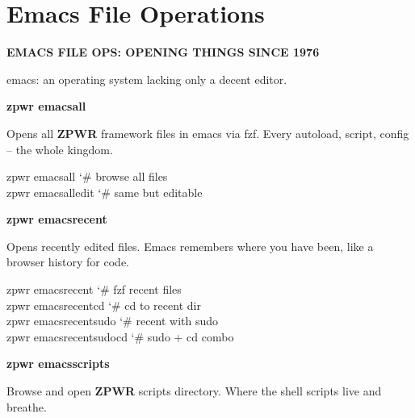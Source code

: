 \documentclass[11pt,a4paper,twoside]{book}
\begin{document}
\vspace{16pt}

\section{Emacs File Operations}


\vspace{10pt}
{\large\bfseries\color{neoncyan} EMACS FILE OPS: OPENING THINGS SINCE 1976}\vspace{6pt}

emacs: an operating system lacking only a decent editor.


\vspace{12pt}
{\bfseries\color{neonyellow} zpwr emacsall}\vspace{4pt}

Opens all \textbf{ZPWR} framework files in emacs via fzf. Every autoload, script, config -- the whole kingdom.

\begin{codebox}
\color{neongreen}zpwr emacsall              {\char`\#} browse all files\\
\color{neongreen}zpwr emacsalledit          {\char`\#} same but editable\\
\end{codebox}


\vspace{12pt}
{\bfseries\color{neonyellow} zpwr emacsrecent}\vspace{4pt}

Opens recently edited files. Emacs remembers where you have been, like a browser history for code.

\begin{codebox}
\color{neongreen}zpwr emacsrecent            {\char`\#} fzf recent files\\
\color{neongreen}zpwr emacsrecentcd          {\char`\#} cd to recent dir\\
\color{neongreen}zpwr emacsrecentsudo        {\char`\#} recent with sudo\\
\color{neongreen}zpwr emacsrecentsudocd      {\char`\#} sudo + cd combo\\
\end{codebox}


\vspace{12pt}
{\bfseries\color{neonyellow} zpwr emacsscripts}\vspace{4pt}

Browse and open \textbf{ZPWR} scripts directory. Where the shell scripts live and breathe.
\end{document}
